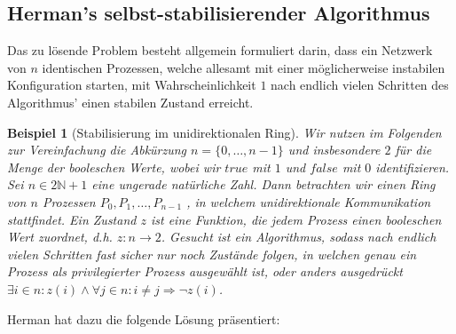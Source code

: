 \documentclass[a4paper]{article}
\newtheorem{beispiel}[satz]{Beispiel}
\theoremstyle{nonumberplain}
\begin{document}
\subsection{Herman's selbst-stabilisierender Algorithmus}

Das zu lösende Problem besteht allgemein formuliert darin, dass ein Netzwerk von $n$ identischen Prozessen, welche allesamt mit einer möglicherweise instabilen Konfiguration starten, mit Wahrscheinlichkeit $1$ nach endlich vielen Schritten des Algorithmus' einen stabilen Zustand erreicht.

\begin{beispiel}[Stabilisierung im unidirektionalen Ring]
	\hspace{0.5em} Wir nutzen im Folgenden zur Vereinfachung die Abkürzung $n = \{0,\dots,n-1\}$ und insbesondere $2$ für die Menge der booleschen Werte, wobei wir $true$ mit $1$ und $false$ mit $0$ identifizieren.
	Sei $n \in 2\mathbb{N}+1$ eine ungerade natürliche Zahl. Dann betrachten wir einen Ring von $n$ Prozessen $P_0, P_1, \dots, P_{n-1}$ , in welchem unidirektionale Kommunikation stattfindet. Ein Zustand $z$ ist eine Funktion, die jedem Prozess einen booleschen Wert zuordnet, d.h. $z : n \to 2$.
	Gesucht ist ein Algorithmus, sodass nach endlich vielen Schritten fast sicher nur noch Zustände folgen, in welchen genau ein Prozess als privilegierter Prozess ausgewählt ist, oder anders ausgedrückt $\exists i \in n : z(i) \land \forall j \in n: i\neq j \Rightarrow \neg z(i)$.
\end{beispiel}

Herman hat dazu die folgende Lösung präsentiert:
\end{document}

